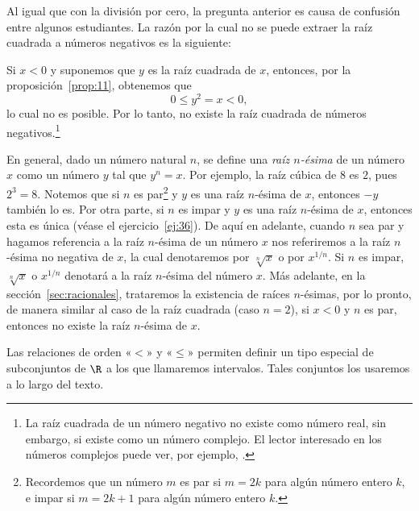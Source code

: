 \documentclass[12pt,a4paper]{book}
\begin{document}
    \begin{observacion}\label{obs:4}
        Al igual que con la división por cero, la pregunta
        anterior es causa de confusión entre algunos estudiantes. La razón por la cual
        no se puede extraer la raíz cuadrada a números negativos es la siguiente:

        Si $x<0$ y suponemos que $y$ es la raíz cuadrada de $x$, entonces, por la
        proposición~\ref{prop:11}, obtenemos que
        \begin{equation*}
            0\leq y^{2}=x<0,
        \end{equation*}
        lo cual no es posible. Por lo tanto, no existe la raíz cuadrada de números
        negativos.\footnote{La raíz cuadrada de un número negativo no existe como número real, sin embargo, si
        existe como un número complejo. El lector interesado en los números complejos puede ver,
        por ejemplo, \cite{nunez2020variable}.}
    \end{observacion}

    En general, dado un número natural $n$, se define una \textit{raíz $n$-ésima} de un
    número $x$ como un número $y$ tal que $y^{n}=x$. Por ejemplo, la raíz cúbica de
    $8$ es $2$, pues $2^{3}=8$. Notemos que si $n$ es par\footnote{Recordemos que un número $m$ es par si $m=2k$ para algún número entero $k$, e impar si
    $m=2k+1$ para algún número entero $k$.} y $y$ es una raíz $n$-ésima de $x$,
    entonces $-y$ también lo es. Por otra parte, si $n$ es impar y $y$ es una raíz $n$-ésima
    de $x$, entonces esta es única (véase el ejercicio~\ref{ej:36}). De aquí en adelante,
    cuando $n$ sea par y hagamos referencia a la raíz $n$-ésima de un número $x$ nos
    referiremos a la raíz $n$-ésima no negativa de $x$, la cual denotaremos por $\sqrt[n]{x}$ o
    por $x^{1/n}$. Si $n$ es impar, $\sqrt[n]{x}$ o $x^{1/n}$ denotará a la raíz $n$-ésima del número $x$.
    Más adelante, en la sección~\ref{sec:racionales}, trataremos la existencia de raíces $n$-ésimas,
    por lo pronto, de manera similar al caso de la raíz cuadrada (caso $n=2$), si
    $x<0$ y $n$ es par, entonces no existe la raíz $n$-ésima de $x$.

    Las relaciones de orden «$<$» y «$\leq$» permiten definir un tipo especial
    de subconjuntos de $\R$ a los que llamaremos intervalos. Tales conjuntos los
    usaremos a lo largo del texto.
\end{document}
